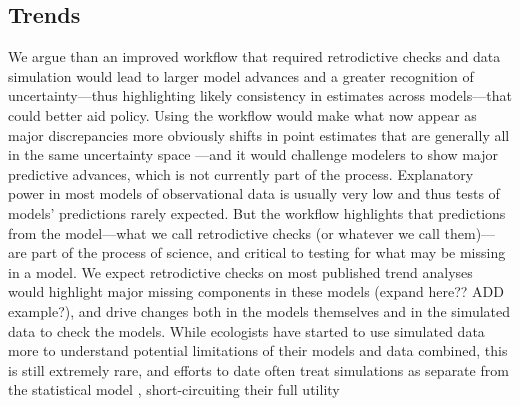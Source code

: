 \documentclass[11pt]{article}
\begin{document}
\subsection{Trends}



We argue than an improved workflow that required retrodictive checks and data simulation would lead to larger model advances and a greater recognition of uncertainty---thus highlighting likely consistency in estimates across models---that could better aid policy.  Using the workflow would make what now appear as major discrepancies more obviously shifts in point estimates that are generally all in the same uncertainty space \citep{Johnson2024}---and it would challenge modelers to show major predictive advances, which is not currently part of the process. Explanatory power in most models of observational data is usually very low \citep{low2014rising,moller2002much} and thus tests of models' predictions rarely expected. But the workflow highlights that predictions from the model---what we call retrodictive checks (or whatever we call them)---are part of the process of science, and critical to testing for what may be missing in a model. We expect retrodictive checks on most published trend analyses would highlight major missing components in these models (expand here?? ADD example?), and drive changes both in the models themselves and in the simulated data to check the models. While ecologists have started to use simulated data more to understand potential limitations of their models and data combined, this is still extremely rare, and efforts to date often treat simulations as separate from the statistical model \citep{Buschke2021,dove2023quantifying}, short-circuiting their full utility
\end{document}
